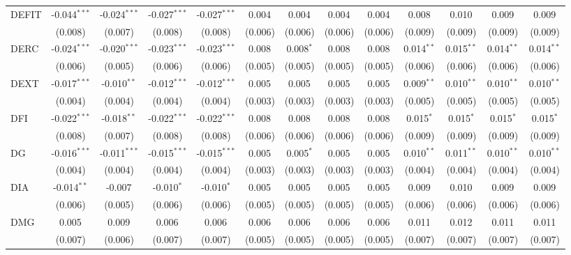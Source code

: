 \begin{table}[!htbp]
\begin{tabular}{@{\extracolsep{5pt}}lcccccccccccc}
 DEFIT & -0.044$^{***}$ & -0.024$^{***}$ & -0.027$^{***}$ & -0.027$^{***}$ & 0.004$^{}$ & 0.004$^{}$ & 0.004$^{}$ & 0.004$^{}$ & 0.008$^{}$ & 0.010$^{}$ & 0.009$^{}$ & 0.009$^{}$ \\
  & (0.008) & (0.007) & (0.008) & (0.008) & (0.006) & (0.006) & (0.006) & (0.006) & (0.009) & (0.009) & (0.009) & (0.009) \\
 DERC & -0.024$^{***}$ & -0.020$^{***}$ & -0.023$^{***}$ & -0.023$^{***}$ & 0.008$^{}$ & 0.008$^{*}$ & 0.008$^{}$ & 0.008$^{}$ & 0.014$^{**}$ & 0.015$^{**}$ & 0.014$^{**}$ & 0.014$^{**}$ \\
  & (0.006) & (0.005) & (0.006) & (0.006) & (0.005) & (0.005) & (0.005) & (0.005) & (0.006) & (0.006) & (0.006) & (0.006) \\
 DEXT & -0.017$^{***}$ & -0.010$^{**}$ & -0.012$^{***}$ & -0.012$^{***}$ & 0.005$^{}$ & 0.005$^{}$ & 0.005$^{}$ & 0.005$^{}$ & 0.009$^{**}$ & 0.010$^{**}$ & 0.010$^{**}$ & 0.010$^{**}$ \\
  & (0.004) & (0.004) & (0.004) & (0.004) & (0.003) & (0.003) & (0.003) & (0.003) & (0.005) & (0.005) & (0.005) & (0.005) \\
 DFI & -0.022$^{***}$ & -0.018$^{**}$ & -0.022$^{***}$ & -0.022$^{***}$ & 0.008$^{}$ & 0.008$^{}$ & 0.008$^{}$ & 0.008$^{}$ & 0.015$^{*}$ & 0.015$^{*}$ & 0.015$^{*}$ & 0.015$^{*}$ \\
  & (0.008) & (0.007) & (0.008) & (0.008) & (0.006) & (0.006) & (0.006) & (0.006) & (0.009) & (0.009) & (0.009) & (0.009) \\
 DG & -0.016$^{***}$ & -0.011$^{***}$ & -0.015$^{***}$ & -0.015$^{***}$ & 0.005$^{}$ & 0.005$^{*}$ & 0.005$^{}$ & 0.005$^{}$ & 0.010$^{**}$ & 0.011$^{**}$ & 0.010$^{**}$ & 0.010$^{**}$ \\
  & (0.004) & (0.004) & (0.004) & (0.004) & (0.003) & (0.003) & (0.003) & (0.003) & (0.004) & (0.004) & (0.004) & (0.004) \\
 DIA & -0.014$^{**}$ & -0.007$^{}$ & -0.010$^{*}$ & -0.010$^{*}$ & 0.005$^{}$ & 0.005$^{}$ & 0.005$^{}$ & 0.005$^{}$ & 0.009$^{}$ & 0.010$^{}$ & 0.009$^{}$ & 0.009$^{}$ \\
  & (0.006) & (0.005) & (0.006) & (0.006) & (0.005) & (0.005) & (0.005) & (0.005) & (0.006) & (0.006) & (0.006) & (0.006) \\
 DMG & 0.005$^{}$ & 0.009$^{}$ & 0.006$^{}$ & 0.006$^{}$ & 0.006$^{}$ & 0.006$^{}$ & 0.006$^{}$ & 0.006$^{}$ & 0.011$^{}$ & 0.012$^{}$ & 0.011$^{}$ & 0.011$^{}$ \\
  & (0.007) & (0.006) & (0.007) & (0.007) & (0.005) & (0.005) & (0.005) & (0.005) & (0.007) & (0.007) & (0.007) & (0.007) \\

\end{tabular}
\end{table}
